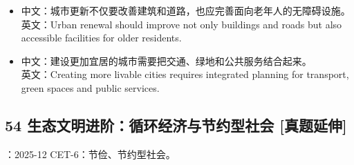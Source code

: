 \documentclass[a4paper,11pt,UTF8,fontset=none]{ctexart}
\begin{document}
\par

\begin{itemize}[leftmargin=1.7em,itemsep=1pt,parsep=0pt,topsep=2pt]
\item \noindent 中文：城市更新不仅要改善建筑和道路，也应完善面向老年人的无障碍设施。\\ 英文：Urban renewal should improve not only buildings and roads but also accessible facilities for older residents.\par


\item \noindent 中文：建设更加宜居的城市需要把交通、绿地和公共服务结合起来。\\ 英文：Creating more livable cities requires integrated planning for transport, green spaces and public services.\par


\end{itemize}

\subsection{54 生态文明进阶：循环经济与节约型社会 {\color{AccentBlue} [真题延伸]}}

\begin{tcolorbox}[enhanced,breakable,boxrule=0.35pt,colback=VeryPaleBlue,colframe=AccentBlue!40,left=7pt,right=7pt,top=4pt,bottom=4pt,borderline west={2pt}{0pt}{AccentBlue},before skip=4pt,after skip=6pt]
：2025-12 CET-6：节俭、节约型社会。\par


\end{tcolorbox}
\end{document}
